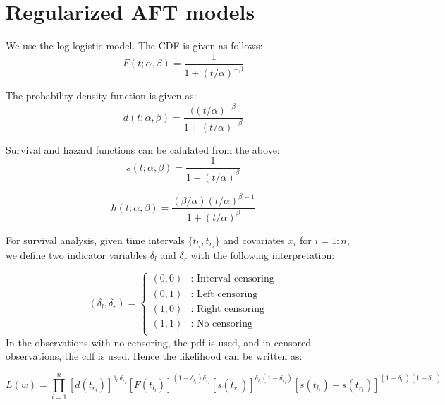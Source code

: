 \documentclass[12pt,a4paper]{report}
\begin{document}
\section{Regularized AFT models}

We use the log-logistic model. The CDF is given as follows:
\begin{equation} \label{cdf}
F(t;\alpha, \beta) = \frac{1}{1+(t/\alpha)^{-\beta}}
\end{equation}

The probability density function is given as:
\begin{equation} \label{pdf}
d(t;\alpha, \beta) = \frac{((t/{\alpha})^{-\beta}}{1+(t/\alpha)^{-\beta}}
\end{equation}

Survival and hazard functions can be calulated from the above:
\begin{equation} \label{survival}
s(t;\alpha, \beta) = \frac{1}{1+(t/\alpha)^{\beta}}
\end{equation}

\begin{equation} \label{hazard}
h(t;\alpha, \beta) = \frac{ (\beta/\alpha) (t/\alpha) ^ {\beta-1}}
						  {1+(t/\alpha)^{\beta}}
\end{equation}


For survival analysis, given time intervals $\{t_{l_i}, t_{r_i}\}$ and covariates $x_i$ for $i=1:n$,
we define two indicator variables $\delta_l$ and $\delta_r$ with the following
interpretation:

\begin{equation} \label{deltas}
(\delta_l, \delta_r) = 
		\begin{cases} (0, 0) & \mbox{: Interval censoring} \\
					  (0, 1) & \mbox{: Left censoring} \\
					  (1, 0) & \mbox{: Right censoring} \\
					  (1, 1) & \mbox{: No censoring} \\
		\end{cases}
\end{equation}
\vspace{8mm}
In the observations with no censoring, the pdf is used, and in censored observations,
the cdf is used. Hence the likelihood can be written as:

\begin{equation} \label{lik0}
L(w) = \prod_{i=1}^n [d(t_{r_i})]^{\delta_{l_i} \delta_{r_i}}
					 [F(t_{l_i})]^{(1-\delta_{l_i}) \delta_{r_i}}
					 [s(t_{r_i})]^{\delta_{l_i} (1-\delta_{r_i})}
					 [s(t_{l_i}) - s(t_{r_i})]^{(1-\delta_{l_i}) (1-\delta_{r_i})}
\end{equation}
\end{document}
